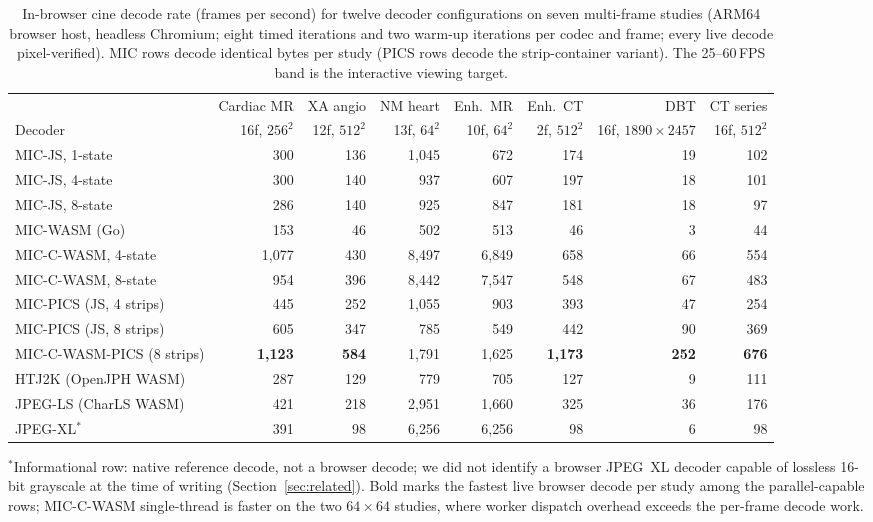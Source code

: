 \documentclass[journal]{IEEEtran}
\begin{document}
\begin{table}[htbp]
\centering
\caption{In-browser cine decode rate (frames per second) for twelve decoder
configurations on seven multi-frame studies (ARM64 browser host, headless
Chromium; eight timed iterations and two warm-up iterations per codec and
frame; every live decode pixel-verified). MIC rows decode identical bytes
per study (PICS rows decode the strip-container variant). The 25--60\,FPS
band is the interactive viewing target.}
\label{tab:cine-fps}
\scriptsize
\setlength{\tabcolsep}{4pt}
\begin{tabular}{lrrrrrrr}
\toprule
 & Cardiac MR & XA angio & NM heart & Enh.\ MR & Enh.\ CT & DBT & CT series \\
Decoder & 16f, $256^2$ & 12f, $512^2$ & 13f, $64^2$ & 10f, $64^2$ & 2f, $512^2$ & 16f, $1890{\times}2457$ & 16f, $512^2$ \\
\midrule
MIC-JS, 1-state          & 300 & 136 & 1{,}045 & 672 & 174 & 19 & 102 \\
MIC-JS, 4-state          & 300 & 140 & 937 & 607 & 197 & 18 & 101 \\
MIC-JS, 8-state          & 286 & 140 & 925 & 847 & 181 & 18 & 97 \\
MIC-WASM (Go)            & 153 & 46 & 502 & 513 & 46 & 3 & 44 \\
MIC-C-WASM, 4-state      & 1{,}077 & 430 & 8{,}497 & 6{,}849 & 658 & 66 & 554 \\
MIC-C-WASM, 8-state      & 954 & 396 & 8{,}442 & 7{,}547 & 548 & 67 & 483 \\
MIC-PICS (JS, 4 strips)  & 445 & 252 & 1{,}055 & 903 & 393 & 47 & 254 \\
MIC-PICS (JS, 8 strips)  & 605 & 347 & 785 & 549 & 442 & 90 & 369 \\
MIC-C-WASM-PICS (8 strips) & \textbf{1{,}123} & \textbf{584} & 1{,}791 & 1{,}625 & \textbf{1{,}173} & \textbf{252} & \textbf{676} \\
\midrule
HTJ2K (OpenJPH WASM)     & 287 & 129 & 779 & 705 & 127 & 9 & 111 \\
JPEG-LS (CharLS WASM)    & 421 & 218 & 2{,}951 & 1{,}660 & 325 & 36 & 176 \\
JPEG-XL$^\ast$           & 391 & 98 & 6{,}256 & 6{,}256 & 98 & 6 & 98 \\
\bottomrule
\end{tabular}

\vspace{2pt}
{\scriptsize $^\ast$Informational row: native reference decode, not a
browser decode; we did not identify a browser JPEG~XL decoder capable of
lossless 16-bit grayscale at the time of writing
(Section~\ref{sec:related}). Bold marks the fastest live browser decode per
study among the parallel-capable rows; MIC-C-WASM single-thread is faster
on the two $64{\times}64$ studies, where worker dispatch overhead exceeds
the per-frame decode work.}
\end{table}
\end{document}
